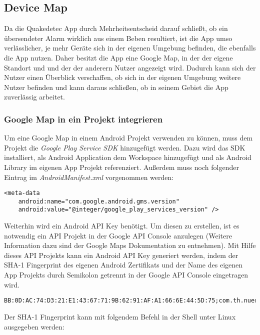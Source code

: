 \newpage
\subsection{Device Map}
Da die Quakedetec App durch Mehrheitsentscheid darauf schließt, ob ein übersendeter Alarm wirklich aus einem Beben resultiert, ist die App umso verlässlicher, je mehr Geräte sich in der eigenen Umgebung befinden, die ebenfalls die App nutzen. Daher besitzt die App eine Google Map, in der der eigene Standort und und der der anderern Nutzer angezeigt wird. Dadurch kann sich der Nutzer einen Überblick verschaffen, ob sich in der eigenen Umgebung weitere Nutzer befinden und kann daraus schließen, ob in seinem Gebiet die App zuverlässig arbeitet.

\subsubsection{Google Map in ein Projekt integrieren}
Um eine Google Map in einem Android Projekt verwenden zu können, muss dem Projekt die \textit{Google Play Service SDK} hinzugefügt werden. Dazu wird das SDK installiert, als Android Application dem Workspace hinzugefügt und als Android Library im eigenen App Projekt referenziert. Außerdem muss noch folgender Eintrag im \textit{AndroidManifest.xml} vorgenommen werden:
\bigskip
\begin{lstlisting}[caption={Google Map AndroidManifest.xml Eintrag},label=lst:MapInsertManifest]
<meta-data
    android:name="com.google.android.gms.version"
    android:value="@integer/google_play_services_version" />
\end{lstlisting}
\par\bigskip
Weiterhin wird ein Android API Key benötigt. Um diesen zu erstellen, ist es notwendig ein API Projekt in der Google API Console anzulegen (Weitere Information dazu sind der Google Maps Dokumentation zu entnehmen). Mit Hilfe dieses API Projekts kann ein Android API Key generiert werden, indem der SHA-1 Fingerprint des eigenen Android Zertifikats und der Name des eigenen App Projekts durch Semikolon getrennt in der Google API Console eingetragen wird.
\bigskip
\begin{lstlisting}[caption={Android API Key generieren},label=lst:AndroidApiKey, basicstyle=\small]
BB:0D:AC:74:D3:21:E1:43:67:71:9B:62:91:AF:A1:66:6E:44:5D:75;com.th.nuernberg.itp.earthquakedetection
\end{lstlisting}

\newpage

Der SHA-1 Fingerprint kann mit folgendem Befehl in der Shell unter Linux ausgegeben werden: 

